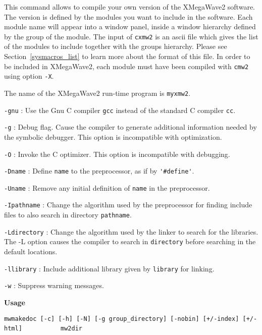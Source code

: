 \Next

\Description
This command allows to compile your own version of the XMegaWave2 software.
The version is defined by the modules you want to include in the software.
Each module name will appear into a window panel, inside a window hierarchy
defined by the group of the module. 
The input of \verb+cxmw2+ is an ascii file which gives the list of the modules
to include together with the groups hierarchy.
Please see Section~\ref{sysmacros_list} to learn more about the format
of this file.
In order to be included in XMegaWave2, each module must have been compiled
with \verb+cmw2+ using option \verb+-X+.

The name of the XMegaWave2 run-time program is \verb+myxmw2+.
\Next

\Options
\verb+-gnu+ : Use the Gnu C compiler \verb+gcc+ instead of the standard C compiler \verb+cc+.

\verb+-g+ : Debug flag. Cause the compiler to generate additional information
needed by the symbolic debugger.  This option is incompatible with optimization.

\verb+-O+ : Invoke the C optimizer. This option is incompatible with debugging.

\verb+-Dname+ : Define \verb+name+ to the preprocessor, as if by \verb+'#define'+.

\verb+-Uname+ : Remove any initial definition of \verb+name+ in the preprocessor. 

\verb+-Ipathname+ : Change the algorithm used by the preprocessor for finding include files to also search in directory \verb+pathname+.

\verb+-Ldirectory+ :  Change the algorithm used by the linker to search for
the libraries.  The -L option causes the compiler to search in \verb+directory+ before searching in the default locations.

\verb+-llibrary+ : Include additional library given by \verb+library+ for linking.

\verb+-w+ : Suppress warning messages.


\newpage

{\Large\bf Usage} \bigskip

\verb=mwmakedoc [-c] [-h] [-N] [-g group_directory] [-nobin] [+/-index] [+/-html]=
\newline
\verb=          mw2dir=
\Next

